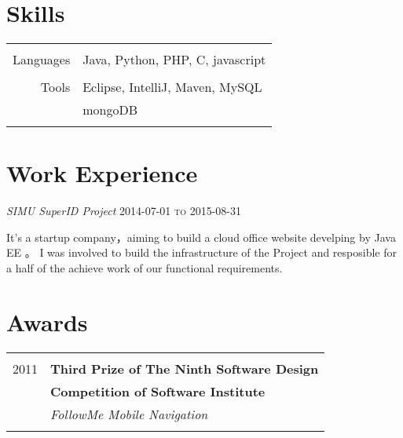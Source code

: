 \documentclass[10pt]{article} %
\begin{document}
{\begin{minipage}[t]{0.42\textwidth}

\section{Skills} 

\begin{tabular}{rl}
& \\
Languages
& Java, Python, PHP, C, javascript\\ 
& \\
Tools
& Eclipse, IntelliJ, Maven, MySQL\\
& mongoDB\\
& \\ 
\end{tabular}


\section{Work Experience} 

{\large \textit{SIMU SuperID Project}} \hfill  \hfill {\textsc{2014-07-01 to 2015-08-31}}

\normalsize{It's a startup company，aiming to build a cloud office website develping by Java EE 。
 I was involved to build the infrastructure of the Project and resposible for a half of the achieve work of our functional requirements.  }\\


\section{Awards} 

\begin{tabular}{rl}
& \\
2011  & \textbf{Third Prize of The Ninth Software Design}\\
& \textbf{Competition of Software Institute}\\
& \textit{FollowMe Mobile Navigation}\\ \\


\end{tabular}
\end{minipage}}
\end{document}

